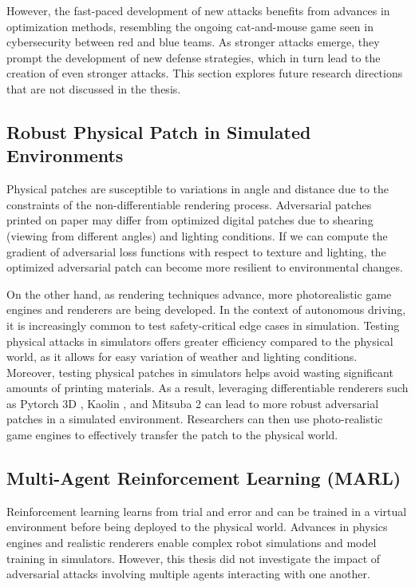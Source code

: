 However, the fast-paced development of new attacks benefits from advances in optimization methods, resembling the ongoing cat-and-mouse game seen in cybersecurity between red and blue teams. As stronger attacks emerge, they prompt the development of new defense strategies, which in turn lead to the creation of even stronger attacks. This section explores future research directions that are not discussed in the thesis.

\subsection{Robust Physical Patch in Simulated Environments}

Physical patches are susceptible to variations in angle and distance due to the constraints of the non-differentiable rendering process. Adversarial patches printed on paper may differ from optimized digital patches due to shearing (viewing from different angles) and lighting conditions. If we can compute the gradient of adversarial loss functions with respect to texture and lighting, the optimized adversarial patch can become more resilient to environmental changes. 

On the other hand, as rendering techniques advance, more photorealistic game engines and renderers are being developed. In the context of autonomous driving, it is increasingly common to test safety-critical edge cases in simulation. Testing physical attacks in simulators offers greater efficiency compared to the physical world, as it allows for easy variation of weather and lighting conditions. Moreover, testing physical patches in simulators helps avoid wasting significant amounts of printing materials. As a result, leveraging differentiable renderers such as Pytorch 3D \citep{ravi2020pytorch3d}, Kaolin \citep{KaolinLibrary}, and Mitsuba 2 \citep{nimier2019mitsuba} can lead to more robust adversarial patches in a simulated environment. Researchers can then use photo-realistic game engines to effectively transfer the patch to the physical world.

\subsection{Multi-Agent Reinforcement Learning (MARL)}

Reinforcement learning learns from trial and error and can be trained in a virtual environment before being deployed to the physical world. Advances in physics engines and realistic renderers enable complex robot simulations and model training in simulators. However, this thesis did not investigate the impact of adversarial attacks involving multiple agents interacting with one another.

